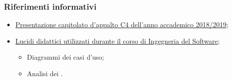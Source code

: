 \subsubsection{Riferimenti informativi}
\begin{itemize}
	\item \href{https://www.math.unipd.it/~tullio/IS-1/2018/Progetto/C4p.pdf} {Presentazione capitolato d’appalto C4 dell'anno accademico 2018/2019};
	\item \href{https://www.math.unipd.it/~tullio/IS-1/2018/} {Lucidi didattici utilizzati durante il corso di Ingegneria del Software};
	\begin{itemize}
		\item Diagrammi dei casi d’uso;
		\item Analisi dei .
	\end{itemize}
\end{itemize}

